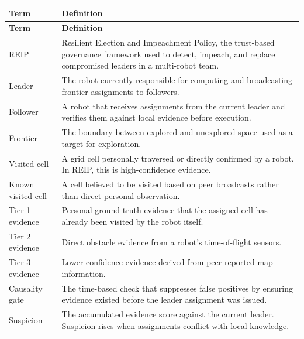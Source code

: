 \documentclass[a4paper,oneside,titlepage,11pt]{report}
\begin{document}
\begin{longtable}{p{} p{}}
\toprule
\textbf{Term} & \textbf{Definition} \\
\midrule
\endfirsthead

\toprule
\textbf{Term} & \textbf{Definition} \\
\midrule
\endhead

REIP & Resilient Election and Impeachment Policy, the trust-based governance framework used to detect, impeach, and replace compromised leaders in a multi-robot team. \\

Leader & The robot currently responsible for computing and broadcasting frontier assignments to followers. \\

Follower & A robot that receives assignments from the current leader and verifies them against local evidence before execution. \\

Frontier & The boundary between explored and unexplored space used as a target for exploration. \\

Visited cell & A grid cell personally traversed or directly confirmed by a robot. In REIP, this is high-confidence evidence. \\

Known visited cell & A cell believed to be visited based on peer broadcasts rather than direct personal observation. \\

Tier 1 evidence & Personal ground-truth evidence that the assigned cell has already been visited by the robot itself. \\

Tier 2 evidence & Direct obstacle evidence from a robot's time-of-flight sensors. \\

Tier 3 evidence & Lower-confidence evidence derived from peer-reported map information. \\

Causality gate & The time-based check that suppresses false positives by ensuring evidence existed before the leader assignment was issued. \\

Suspicion & The accumulated evidence score against the current leader. Suspicion rises when assignments conflict with local knowledge. \\


\end{longtable}
\end{document}
